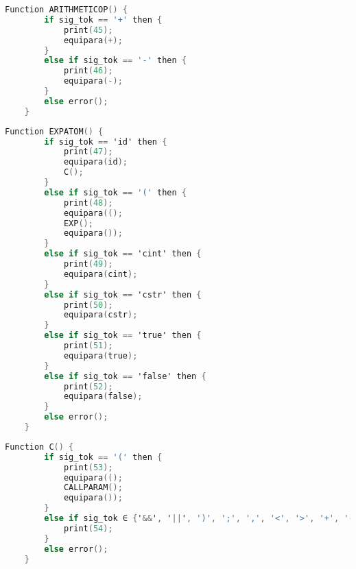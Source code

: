 \begin{lstlisting}[language=C, caption={COMPOP}]
    Function ARITHMETICOP() {
        if sig_tok == '+' then {
            print(45);
            equipara(+);
        }
        else if sig_tok == '-' then {
            print(46);
            equipara(-);
        }
        else error();
    }
\end{lstlisting}

\begin{lstlisting}[language=C, caption={B}]
    Function EXPATOM() {
        if sig_tok == 'id' then {
            print(47);
            equipara(id);
            C();
        }
        else if sig_tok == '(' then {
            print(48);
            equipara(();
            EXP();
            equipara());
        }
        else if sig_tok == 'cint' then {
            print(49);
            equipara(cint);
        }
        else if sig_tok == 'cstr' then {
            print(50);
            equipara(cstr);
        }
        else if sig_tok == 'true' then {
            print(51);
            equipara(true);
        }
        else if sig_tok == 'false' then {
            print(52);
            equipara(false);
        }
        else error();
    }
\end{lstlisting}

\newpage

\begin{lstlisting}[language=C, caption={C}]
    Function C() {
        if sig_tok == '(' then {
            print(53);
            equipara(();
            CALLPARAM();
            equipara());
        }
        else if sig_tok ∈ {'&&', '||', ')', ';', ',', '<', '>', '+', '-'} then {
            print(54);
        }
        else error();
    }
\end{lstlisting}
